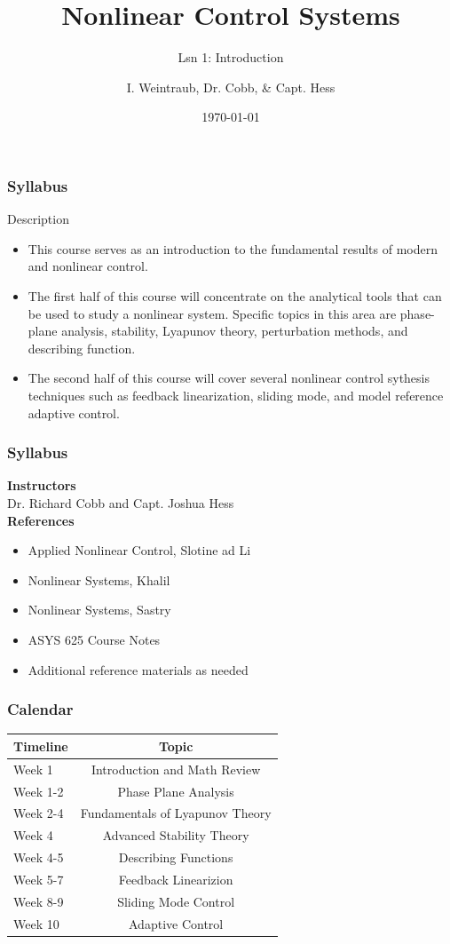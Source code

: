 \documentclass[11pt,handout]{beamer}   %
\title[Your Short Title]{Nonlinear Control Systems}
\subtitle{Lsn 1: Introduction}
\author{I. Weintraub, Dr. Cobb, \& Capt. Hess}
\institute{Air Force Institute of Technology}
\date{\today}
\begin{document}
\begin{frame}
  \titlepage
\end{frame}

\begin{frame}
\frametitle{Syllabus}
    Description
    \begin{itemize}
      \item This course serves as an introduction to the fundamental results of modern and nonlinear control. 
      \item The first half of this course will concentrate on the analytical tools that can be used to study a nonlinear system. Specific topics in this area are phase-plane analysis, stability, Lyapunov theory, perturbation methods, and describing function.
    \item The second half of this course will cover several nonlinear control sythesis techniques such as feedback linearization, sliding mode, and model reference adaptive control.
    \end{itemize}
\end{frame}

\begin{frame}
\frametitle{Syllabus}
	\textbf{Instructors}\\
    Dr. Richard Cobb and Capt. Joshua Hess\\
	\textbf{References}\\
 	\begin{itemize}
 	\item Applied Nonlinear Control, Slotine ad Li
    \item Nonlinear Systems, Khalil
    \item Nonlinear Systems, Sastry
    \item ASYS 625 Course Notes
    \item Additional reference materials as needed
 	\end{itemize}
\end{frame}

\begin{frame}
\frametitle{Calendar}
\begin{table}
\centering
    \begin{tabular}{l  c}
    \hline
    Timeline & Topic \\ \hline
    Week 1 & Introduction and Math Review\\
    Week 1-2 & Phase Plane Analysis\\
    Week 2-4 & Fundamentals of Lyapunov Theory\\
    Week 4   & Advanced Stability Theory\\
    Week 4-5 & Describing Functions \\
    Week 5-7 & Feedback Linearizion \\ 
    Week 8-9 & Sliding Mode Control \\
    Week 10  & Adaptive Control \\\hline
    \end{tabular}
\end{table}
\end{frame}
 
\end{document}
